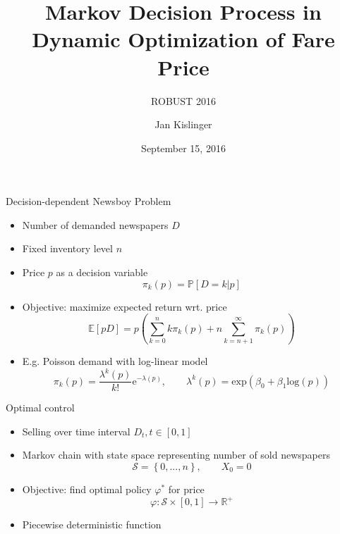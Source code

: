 \documentclass[10pt]{beamer}
\title{Markov Decision Process in Dynamic Optimization of Fare Price}
\subtitle{ROBUST 2016}
\date{September 15, 2016}
\author{Jan Kislinger}
\institute{Department of Probability and Mathematical Statistics, Charles University}
\begin{document}
\maketitle

\begin{frame}[fragile]{Decision-dependent Newsboy Problem}

	\begin{itemize}
		\item Number of demanded newspapers $D$
		\item Fixed inventory level $n$
		\item Price $p$ as a decision variable
			\[
				\pi_k (p) = \mathbb{P} [D = k \vert p ]
			\]
		\item Objective: maximize expected return wrt. price
			\[
				\mathbb{E} [p D] = p \left( \sum_{k=0}^{n} k \pi_k (p) + n \sum_{k=n+1}^{\infty} \pi_k (p) \right)
			\]
		\item
			E.g. Poisson demand with log-linear model
			\[
				\pi_k (p) = \frac{\lambda^k (p)}{k!} \textrm{e}^{-\lambda(p)}, \qquad
				\lambda^k (p) = \textrm{exp} (\beta_0 + \beta_1 \textrm{log} (p))
			\]

	\end{itemize}
		
\end{frame}

\begin{frame}[fragile]{Optimal control}
  
	\begin{itemize}
		\item Selling over time interval $D_t, t \in [0,1]$
		\item Markov chain with state space representing number of sold newspapers
			\[
				\mathcal{S} = \left\{ 0, ..., n \right\}, \qquad X_0 = 0
			\]
		\item Objective: find optimal policy $\varphi^*$ for price
			\[
				\varphi: \mathcal{S} \times [0,1] \to \mathbb{R}^+
			\]
		\item Piecewise deterministic function
	\end{itemize}
	
\end{frame}
\end{document}
